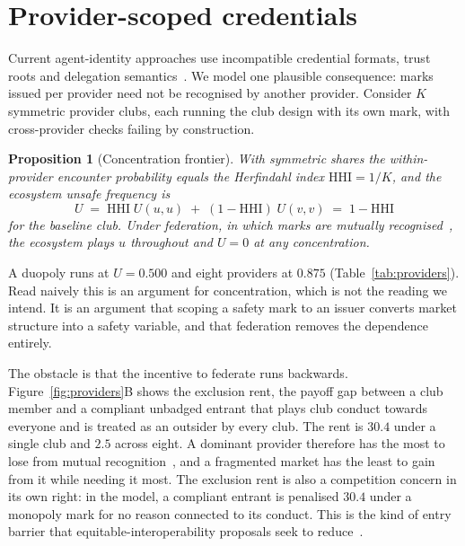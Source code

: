 \documentclass[11pt,a4paper]{article}
\newtheorem{proposition}{Proposition}
\begin{document}
\section{Provider-scoped credentials}
\label{sec:providers}

Current agent-identity approaches use incompatible credential formats, trust
roots and delegation semantics~\citep{otsuka2026aiidentity}. We model one
plausible consequence: marks issued per provider need not be recognised by
another provider. Consider $K$
symmetric provider clubs, each running the club design with its own mark, with
cross-provider checks failing by construction.

\begin{proposition}[Concentration frontier]
\label{prop:providers}
With symmetric shares the within-provider encounter probability equals the
Herfindahl index $\mathrm{HHI} = 1/K$, and the ecosystem unsafe frequency is
\begin{equation}
\label{eq:hhi}
U \;=\; \mathrm{HHI}\; U(u,u) \;+\; (1 - \mathrm{HHI})\; U(v,v)
  \;=\; 1 - \mathrm{HHI}
\end{equation}
for the baseline club. Under federation, in which marks are mutually
recognised~\citep{nicolaidis2005transnational}, the ecosystem plays $u$ throughout
and $U = 0$ at any
concentration.
\end{proposition}

A duopoly runs at $U = 0.500$ and eight providers at $0.875$
(Table~\ref{tab:providers}). Read naively this
is an argument for concentration, which is not the reading we intend. It is an
argument that scoping a safety mark to an issuer converts market structure into
a safety variable, and that federation removes the dependence entirely.

The obstacle is that the incentive to federate runs backwards.
Figure~\ref{fig:providers}B shows the exclusion rent, the payoff gap between a
club member and a compliant unbadged entrant that plays club conduct towards
everyone and is treated as an outsider by every club. The rent is $30.4$ under
a single club and $2.5$ across eight. A dominant provider therefore has the
most to lose from mutual recognition~\citep{katz1985network}, and a fragmented
market has the least to gain from it while needing it most. The exclusion rent
is also a competition concern in its own right: in the model, a compliant
entrant is penalised $30.4$ under a monopoly mark for no reason connected to
its conduct. This is the kind of entry barrier that equitable-interoperability
proposals seek to reduce~\citep{scottmorton2023equitable}.
\end{document}
